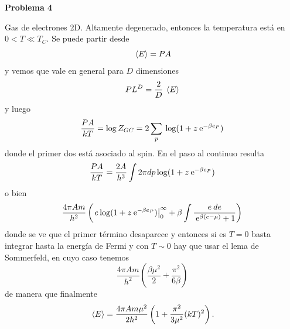 \documentclass[10pt,oneside]{CBFT_book}
\begin{document}
\begin{ejemplo}{\bf Problema 4}

Gas de electrones 2D. Altamente degenerado, entonces la temperatura está en $ 0 < T \ll T_C $.
Se puede partir desde
\[
	\:\left\langle E \right\rangle = P A
\]
y vemos que vale en general para $D$ dimensiones
\[
	P L^D = \frac{ 2 }{ D } \:\left\langle  E  \right\rangle
\]
y luego
\[
	\frac{ P A }{ k T } = \log Z_{GC} = 2 \sum_p \: \log ( 1 + z \:\mathrm{e}^{-\beta e_P})
\]
donde el primer dos está asociado al spin. En el paso al continuo resulta
\[
	\frac{ P A }{ k T } = \frac{ 2 A}{h^3} \int 2 \pi dp \log ( 1 + z \:\mathrm{e}^{-\beta e_P}) 
\]
o bien
\[
	\frac{4 \pi A m}{h^2} \left( \left. e \log ( 1 + z \:\mathrm{e}^{-\beta e_P} ) \right|_0^\infty + 
	\beta \int \frac{ e \: de }{\:\mathrm{e}^{\beta(e-\mu)}+1} \right)
\]
donde se ve que el primer término desaparece y entonces si es $T=0$ basta integrar hasta la energía 
de Fermi y con $T\sim 0$ hay que usar el lema de Sommerfeld, en cuyo caso tenemos
\[
	\frac{4 \pi A m}{h^2} \left( \frac{ \beta \mu^2 }{ 2 } + \frac{ \pi^2 }{ 6 \beta } \right)
\]
de manera que finalmente
\[
	\:\left\langle E \right\rangle = \frac{4 \pi A m \mu^2 }{2h^2} \left( 1 + \frac{ \pi^2 }{ 3 \mu^2 }(kT)^2 \right).
\]
\end{ejemplo}
\end{document}
